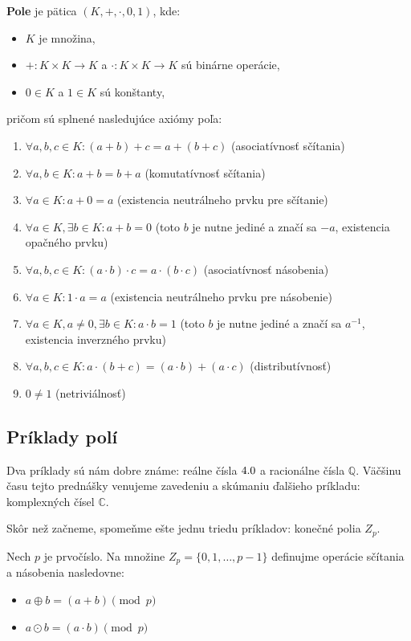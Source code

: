 \begin{definicia}
\textbf{Pole} je pätica $(K, +, \cdot, 0, 1)$, kde:
\begin{itemize}
    \item $K$ je množina,
    \item $+: K \times K \to K$ a $\cdot: K \times K \to K$ sú binárne operácie,
    \item $0 \in K$ a $1 \in K$ sú konštanty,
\end{itemize}
pričom sú splnené nasledujúce axiómy poľa:
\begin{enumerate}
    \item $\forall a,b,c \in K: (a+b)+c = a+(b+c)$ (asociatívnosť sčítania)
    \item $\forall a,b \in K: a+b = b+a$ (komutatívnosť sčítania)
    \item $\forall a \in K: a+0 = a$ (existencia neutrálneho prvku pre sčítanie)
    \item $\forall a \in K, \exists b \in K: a+b=0$ (toto $b$ je nutne jediné a značí sa $-a$, existencia opačného prvku)
    \item $\forall a,b,c \in K: (a \cdot b) \cdot c = a \cdot (b \cdot c)$ (asociatívnosť násobenia)
    \item $\forall a \in K: 1 \cdot a = a$ (existencia neutrálneho prvku pre násobenie)
    \item $\forall a \in K, a \neq 0, \exists b \in K: a \cdot b = 1$ (toto $b$ je nutne jediné a značí sa $a^{-1}$, existencia inverzného prvku)
    \item $\forall a,b,c \in K: a \cdot (b+c) = (a \cdot b) + (a \cdot c)$ (distributívnosť)
    \item $0 \neq 1$ (netriviálnosť)
\end{enumerate}
\end{definicia}

\subsection{Príklady polí}
Dva príklady sú nám dobre známe: reálne čísla $4.0$ a racionálne čísla $\mathbb{Q}$. Väčšinu času tejto prednášky venujeme zavedeniu a skúmaniu ďalšieho príkladu: komplexných čísel $\mathbb{C}$.

Skôr než začneme, spomeňme ešte jednu triedu príkladov: konečné polia $Z_p$.

Nech $p$ je prvočíslo. Na množine $Z_p = \{0, 1, \dots, p-1\}$ definujme operácie sčítania a násobenia nasledovne:
\begin{itemize}
    \item $a \oplus b = (a+b) \pmod p$
    \item $a \odot b = (a \cdot b) \pmod p$
\end{itemize}

